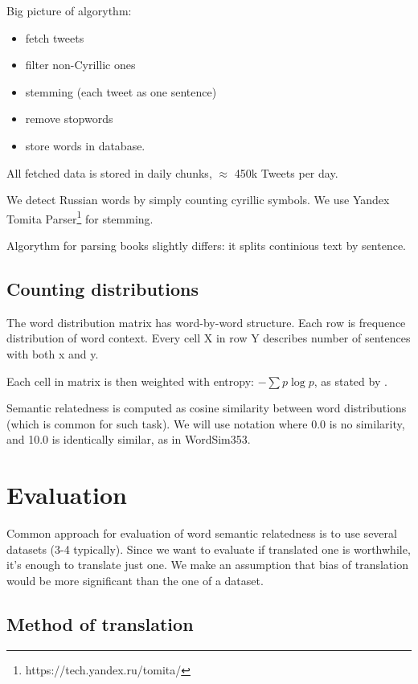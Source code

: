 \documentclass[11pt,letterpaper]{article}
\begin{document}
Big picture of algorythm:
\begin{itemize}
\item fetch tweets
\item filter non-Cyrillic ones
\item stemming (each tweet as one sentence)
\item remove stopwords
\item store words in database.
\end{itemize}

All fetched data is stored in daily chunks, $\approx$ 450k Tweets per day.

We detect Russian words by simply counting cyrillic symbols. We use Yandex Tomita 
Parser\footnote{https://tech.yandex.ru/tomita/} for stemming.

Algorythm for parsing books slightly differs:
it splits continious text by sentence.

\subsection{Counting distributions}

The word distribution matrix has word-by-word structure. 
Each row is frequence distribution of word context. 
Every cell X in row Y describes number of sentences with both x and y.

Each cell in matrix is then weighted with entropy: 
$- \sum p \log p$, as stated by \cite{landauer1998introduction}.

Semantic relatedness is computed as cosine similarity between word distributions 
(which is common for such task).
We will use notation where 0.0 is no similarity, and 10.0 is identically similar, 
as in WordSim353.

\section{Evaluation}

Common approach for evaluation of word semantic relatedness is to use several datasets (3-4 typically). 
Since we want to evaluate if translated one is worthwhile, it's enough to translate just one. 
We make an assumption that bias of translation would be more significant than the one of a dataset.

\subsection{Method of translation}
\end{document}
